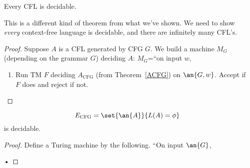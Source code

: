 \begin{cor}
Every CFL is decidable. 
\end{cor}
This is a different kind of theorem from what we've shown. We need to show {\it every} context-free language is decidable, and there are infinitely many CFL's.
\begin{proof}
Suppose $A$ is a CFL generated by CFG $G$. We build a machine $M_G$ (depending on the grammar $G$) deciding $A$: $M_G$=``on input $w$, %
%
\begin{enumerate}
\item
Run TM $F$ deciding $A_{\text{CFG}}$ (from Theorem~\ref{ACFG}) on $\an{G,w}$. Accept if $F$ does and reject if not. 
\end{enumerate}
%
\end{proof}

\begin{thm}
\[
E_{\text{CFG}}=\set{\an{A}}{L(A)=\phi}
\]
is decidable.
\end{thm}
\begin{proof}
Define a Turing machine by the following. ``On input $\an{G}$,
• 
\end{proof}


